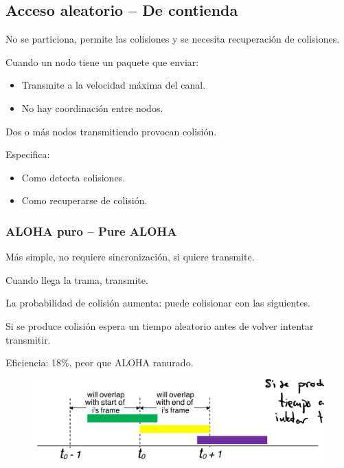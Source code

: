 \documentclass[12pt, twoside, openright]{report} %
\begin{document}
\subsection{Acceso aleatorio -- De contienda} 
No se particiona, permite las
      colisiones y se necesita recuperación de colisiones.

   
        Cuando un nodo tiene un paquete que enviar:

        \begin{itemize}
        \item
          Transmite a la velocidad máxima del canal.
        \item
          No hay coordinación entre nodos.
        \end{itemize}

        Dos o más nodos transmitiendo provocan colisión.

        Especifica:

        \begin{itemize}
        \item
          Como detecta colisiones.
        \item
          Como recuperarse de colisión.
        \end{itemize}
\subsubsection{ALOHA puro -- Pure ALOHA}


          Más simple, no requiere sincronización, si quiere transmite.
        
          Cuando llega la trama, transmite.

          La probabilidad de colisión aumenta: puede colisionar con las
          siguientes.

          Si se produce colisión espera un tiempo aleatorio antes de
          volver intentar transmitir.

          Eficiencia: 18\%, peor que ALOHA ranurado.
          \begin{figure}[H]
            {\includegraphics[scale=.25]{Untitled 50.png}}
          \end{figure}
\end{document}
